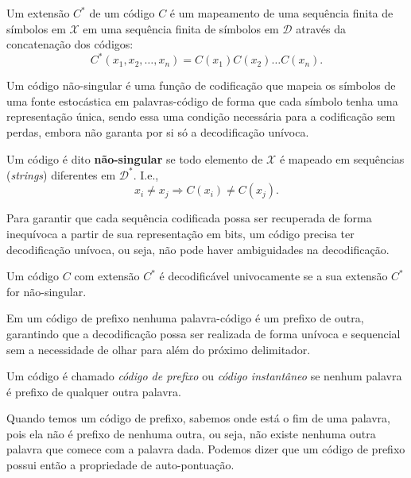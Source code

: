 \begin{definition}
Um extensão $C^\ast$ de um código $C$ é um mapeamento de uma sequência finita
de símbolos em $\mathcal{X}$ em uma sequência finita de símbolos em $\mathcal{D}$ através da
concatenação dos códigos:
\begin{equation}
C^\ast (x_1,x_2,\ldots,x_n) = C(x_1) C(x_2) \ldots C(x_n) .
\end{equation}
\end{definition}

Um código não-singular é uma função de codificação que mapeia os símbolos de
uma fonte estocástica em palavras-código de forma que cada símbolo tenha uma
representação única, sendo essa uma condição necessária para a codificação sem
perdas, embora não garanta por si só a decodificação unívoca.

\begin{definition}
Um código é dito \textbf{não-singular} se todo elemento de $\mathcal{X}$
é mapeado em sequências (\textit{strings}) diferentes em $\mathcal{D}^\ast$. I.e.,
\begin{equation}
x_i \neq x_j \Rightarrow C(x_i) \neq C(x_j) .
\end{equation}
\end{definition}

Para garantir que cada sequência codificada possa ser recuperada de forma inequívoca
a partir de sua representação em bits, um código precisa ter decodificação unívoca,
ou seja, não pode haver ambiguidades na decodificação.

\begin{definition}
Um código $C$ com extensão $C^\ast$ é decodificável univocamente se a sua extensão $C^\ast$ for não-singular.
\end{definition}

Em um código de prefixo nenhuma palavra-código é um prefixo de outra, garantindo que a decodificação possa ser realizada de
forma unívoca e sequencial sem a necessidade de olhar para além do próximo delimitador.

\begin{definition}
Um código é chamado \emph{código de prefixo} ou \emph{código instantâneo} se nenhum palavra
é prefixo de qualquer outra palavra.
\end{definition}

Quando temos um código de prefixo, sabemos onde está o fim de uma palavra, pois ela não
é prefixo de nenhuma outra, ou seja, não existe nenhuma outra palavra que comece com a palavra
dada. Podemos dizer que um código de prefixo possui então a propriedade de auto-pontuação.

